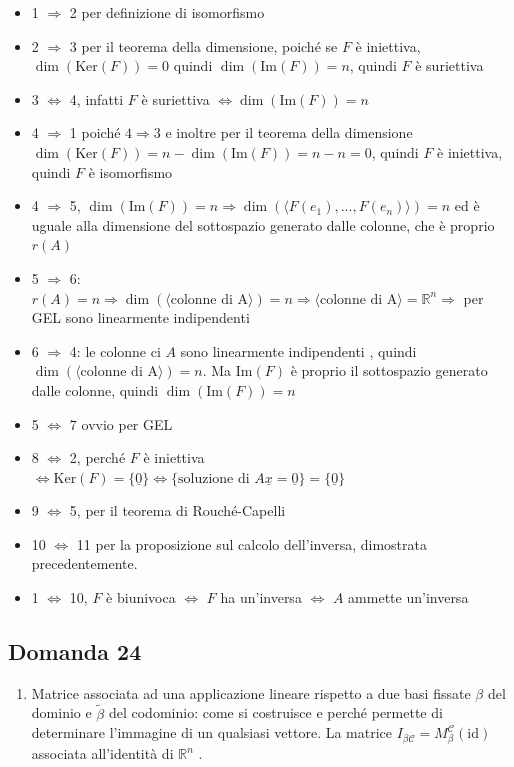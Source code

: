 \documentclass[
  a4paper,
]{article}
\providecommand{\tightlist}{%
  \setlength{\itemsep}{0pt}\setlength{\parskip}{0pt}}
\providecommand{\tightlist}{}
\begin{document}
\begin{itemize}
\tightlist
\item
  1 \(\Rightarrow\) 2 per definizione di isomorfismo
\item
  2 \(\Rightarrow\) 3 per il teorema della dimensione, poiché se \(F\) è
  iniettiva, \(\dim(\text{Ker}(F)) = 0\) quindi
  \(\dim(\text{Im}(F)) = n\), quindi \(F\) è suriettiva
\item
  3 \(\iff\) 4, infatti \(F\) è suriettiva \(\iff \dim(\text{Im}(F))=n\)
\item
  4 \(\Rightarrow\) 1 poiché \(4 \Rightarrow 3\) e inoltre per il
  teorema della dimensione
  \(\dim(\text{Ker}(F)) = n - \dim(\text{Im}(F)) = n - n =0\), quindi
  \(F\) è iniettiva, quindi \(F\) è isomorfismo
\item
  4 \(\Rightarrow\) 5,
  \(\dim(\text{Im}(F))=n \Rightarrow \dim(\langle F(e_1), ..., F(e_n) \rangle) = n\)
  ed è uguale alla dimensione del sottospazio generato dalle colonne,
  che è proprio \(r(A)\)
\item
  5 \(\Rightarrow\) 6:
  \(r(A) = n \Rightarrow \dim(\langle \text{colonne di A} \rangle) = n \Rightarrow \langle \text{colonne di A} \rangle = \mathbb{R}^n \Rightarrow\)
  per GEL sono linearmente indipendenti
\item
  6 \(\Rightarrow\) 4: le colonne ci \(A\) sono linearmente indipendenti
  , quindi \(\dim(\langle \text{colonne di A} \rangle) = n\). Ma
  \(\text{Im}(F)\) è proprio il sottospazio generato dalle colonne,
  quindi \(\dim(\text{Im}(F))=n\)
\item
  5 \(\iff\) 7 ovvio per GEL
\item
  8 \(\iff\) 2, perché \(F\) è iniettiva
  \(\iff \text{Ker}(F) = \{\underline{0}\} \iff \{\text{soluzione di } A\underline{x} = \underline{0}\} = \{\underline{0}\}\)
\item
  9 \(\iff\) 5, per il teorema di Rouché-Capelli
\item
  10 \(\iff\) 11 per la proposizione sul calcolo dell'inversa,
  dimostrata precedentemente.
\item
  1 \(\iff\) 10, \(F\) è biunivoca \(\iff\) \(F\) ha un'inversa \(\iff\)
  \(A\) ammette un'inversa
\end{itemize}

\hypertarget{domanda-24}{%
\subsection{Domanda 24}\label{domanda-24}}

\begin{observationbox}[Domanda]
\begin{enumerate}
\def\labelenumi{\arabic{enumi}.}
\setcounter{enumi}{23}
\tightlist
\item
  Matrice associata ad una applicazione lineare rispetto a due basi
  fissate \(\beta\) del dominio e \(\widetilde{\beta}\) del codominio:
  come si costruisce e perché permette di determinare l'immagine di un
  qualsiasi vettore. La matrice
  \(I_{\beta \mathcal{C}} = M_{\beta}^{\mathcal{C}}(\text{id})\)
  associata all'identità di \(\mathbb{R}^n\) .
\end{enumerate}
\end{observationbox}
\end{document}
